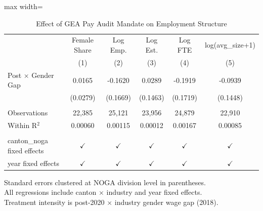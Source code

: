 
\begin{table}[htbp]
   \caption{\label{tab:main} Effect of GEA Pay Audit Mandate on Employment Structure}
   \bigskip
   \centering
   \begin{adjustbox}{max width=\textwidth}
   \begin{tabular}{lccccc}
      \toprule
                                  & Female Share  & Log Emp.      & Log Est.      & Log FTE       & log(avg\_size+1)\\   
                                  & (1)           & (2)           & (3)           & (4)           & (5)\\  
      \midrule 
      Post $\times$ Gender Gap    & 0.0165        & -0.1620       & 0.0289        & -0.1919       & -0.0939\\   
                                  & (0.0279)      & (0.1669)      & (0.1463)      & (0.1719)      & (0.1448)\\   
       \\
      Observations                & 22,385        & 25,121        & 23,956        & 24,879        & 22,910\\  
      Within R$^2$                & 0.00060       & 0.00115       & 0.00012       & 0.00167       & 0.00085\\  
       \\
      canton\_noga fixed effects  & $\checkmark$  & $\checkmark$  & $\checkmark$  & $\checkmark$  & $\checkmark$\\   
      year fixed effects          & $\checkmark$  & $\checkmark$  & $\checkmark$  & $\checkmark$  & $\checkmark$\\   
      \bottomrule
   \end{tabular}
   \end{adjustbox}
   
   \par \raggedright 
   Standard errors clustered at NOGA division level in parentheses.\\
   All regressions include canton $\times$ industry and year fixed effects.\\
   Treatment intensity is post-2020 $\times$ industry gender wage gap (2018).
\end{table}


